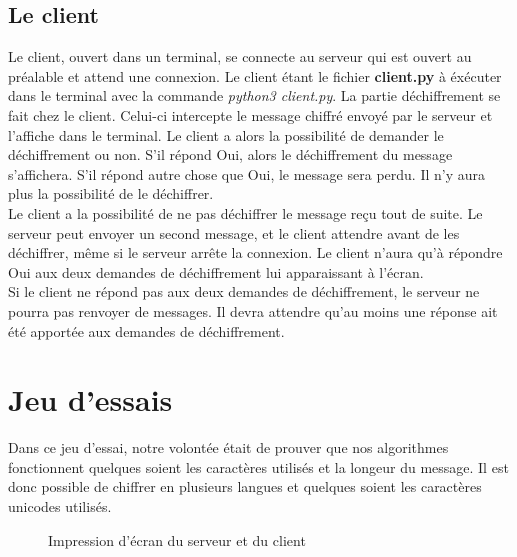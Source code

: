 \documentclass[12pt]{article}
\theoremstyle{definition}
\begin{document}
\begin{CJK}{UTF8}{min}
	\subsection{Le client}
	Le client, ouvert dans un terminal, se connecte au serveur qui est ouvert au préalable et attend une connexion. Le client étant le fichier \textbf{client.py} à éxécuter dans le terminal avec la commande \textit{python3 client.py}. La partie déchiffrement se fait chez le client. Celui-ci intercepte le message chiffré envoyé par le serveur et l'affiche dans le terminal. Le client a alors la possibilité de demander le déchiffrement ou non. S'il répond Oui, alors le déchiffrement du message s'affichera. S'il répond autre chose que Oui, le message sera perdu. Il n'y aura plus la possibilité de le déchiffrer.\\
Le client a la possibilité de ne pas déchiffrer le message reçu tout de suite. Le serveur peut envoyer un second message, et le client attendre avant de les déchiffrer, même si le serveur arrête la connexion. Le client n'aura qu'à répondre Oui aux deux demandes de déchiffrement lui apparaissant à l'écran.\\
Si le client ne répond pas aux deux demandes de déchiffrement, le serveur ne pourra pas renvoyer de messages. Il devra attendre qu'au moins une réponse ait été apportée aux demandes de déchiffrement. 

\pagebreak
\section{Jeu d'essais}
Dans ce jeu d'essai, notre volontée était de prouver que nos algorithmes fonctionnent quelques soient les caractères utilisés et la longeur du message. Il est donc possible de chiffrer en plusieurs langues et quelques soient les caractères unicodes utilisés.

\begin{figure}[H]
  \caption{Impression d'écran du serveur et du client}
  \label{fig:key}
\end{figure}


\end{CJK}
\end{document}
